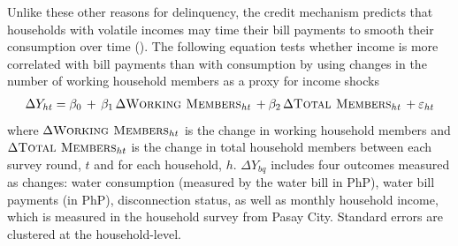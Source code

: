 \documentclass[12pt]{article}
\begin{document}


Unlike these other reasons for delinquency, the credit mechanism predicts that households with volatile incomes may time their bill payments to smooth their consumption over time (\cite{deaton1991saving}).  The following equation tests whether income is more correlated with bill payments than with consumption by using changes in the number of working household members as a proxy for income shocks
\begin{align*}
\Delta Y_{ht} =\beta_0\,+\, \beta_1\, \Delta \textsc{Working Members}_{ht} \, + \beta_2\, \Delta \textsc{Total Members}_{ht}   \,+\varepsilon_{ht}
\end{align*}
where $ \Delta \textsc{Working Members}_{ht} $ is the change in working household members and \\ $\Delta \textsc{Total Members}_{ht}$ is the change in total household members between each survey round, $t$ and for each household, $h$.  $\Delta Y_{bq}$ includes four outcomes measured as changes: water consumption (measured by the water bill in PhP), water bill payments (in PhP), disconnection status, as well as monthly household income, which is measured in the household survey from Pasay City.  Standard errors are clustered at the household-level.
\end{document}

